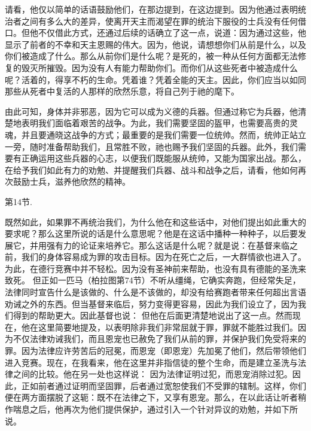 \par

请看，他仅以简单的话语鼓励他们，在那边提到，在这边提到。因为他通过表明统治者之间有多么大的差异，使离开天主而渴望在罪的统治下服役的士兵没有任何借口。但他不仅借此方式，还通过后续的话确立了这一点，说道：因为通过这些，他显示了前者的不幸和天主恩赐的伟大。因为，他说，请想想你们从前是什么，以及你们被造成了什么。那么从前你们是什么呢？是死的，被一种从任何方面都无法修复的毁灭所摧毁。因为没有人有能力帮助你们。而你们从这些死者中被造成什么呢？活着的，得享不朽的生命。凭着谁？凭着全能的天主。因此，你们应当以如同那些从死者中复活的人那样的欣然乐意，将自己列于祂的麾下。\par

\par

由此可知，身体并非邪恶，因为它可以成为义德的兵器。但通过称它为兵器，他清楚地表明我们面临着艰苦的战争。为此，我们需要坚固的盔甲，也需要高贵的灵魂，并且要通晓这战争的方式；最重要的是我们需要一位统帅。然而，统帅正站立一旁，随时准备帮助我们，且常胜不败，祂也赐予我们坚固的兵器。此外，我们需要有正确运用这些兵器的心志，以便我们既能服从统帅，又能为国家出战。那么，在给予我们如此有力的劝勉、并提醒我们兵器、战斗和战争之后，请看，他如何再次鼓励士兵，滋养他欣然的精神。\par

第14节. \par

既然如此，如果罪不再统治我们，为什么他在和这些话中，对他们提出如此重大的要求呢？那么这里所说的话是什么意思呢？他是在这话中播种一种种子，以后要发展它，并用强有力的论证来培养它。那么这话是什么呢？就是说：在基督来临之前，我们的身体容易成为罪的攻击目标。因为在死亡之后，一大群情欲也进入了。为此，在德行竞赛中并不轻松。因为没有圣神前来帮助，也没有具有德能的圣洗来致死。 但正如一匹马（柏拉图第74节）不听从缰绳，它确实奔跑，但经常失足，法律同时宣告什么是该做的、什么是不该做的，却没有给赛跑者带来任何超出言语劝诫之外的东西。但当基督来临后，努力变得更容易，因此为我们设立了，因为我们得到的帮助更大。因此基督也说： 但他在后面更清楚地说出了这一点。然而现在，他在这里简要地提及，以表明除非我们非常屈就于罪，罪就不能胜过我们。因为不仅法律劝诫我们，而且恩宠也已赦免了我们从前的罪，并保护我们免受将来的罪。因为法律应许劳苦后的冠冕，而恩宠（即恩宠）先加冕了他们，然后带领他们进入竞赛。现在，在我看来，他在这里并非指信徒的整个生命，而是建立圣洗与法律之间的比较。他在另一处也这样说： 因为法律证明过犯，而恩宠消除过犯。因此，正如前者通过证明而坚固罪，后者通过宽恕使我们不受罪的辖制。这样，你们便在两方面摆脱了这轭：既不在法律之下，又享有恩宠。那么，在以此话让听者稍作喘息之后，他再次为他们提供保护，通过引入一个针对异议的劝勉，并如下所说。\par

